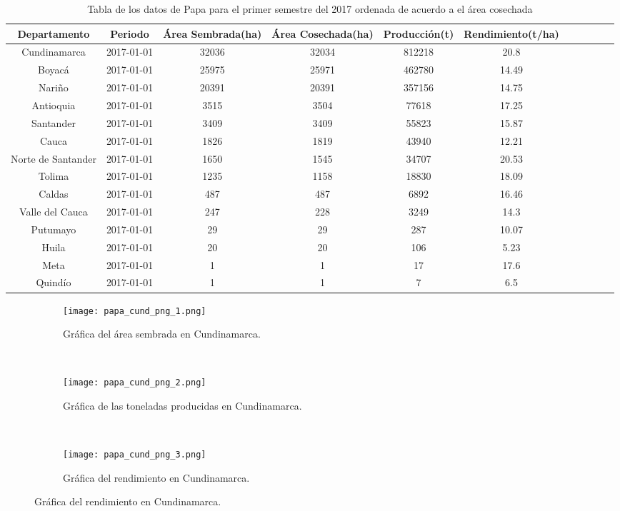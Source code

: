 \documentclass[11pt]{article}
\begin{document}
\newpage
\begin{landscape}



\begin{table}[H] %
\begin{center}
	\begin{tabular}{ccccccccccc}
Departamento&Periodo&Área Sembrada(ha)&Área Cosechada(ha)&Producción(t)&Rendimiento(t/ha)&\\
\hline
Cundinamarca&2017-01-01&32036&32034&812218&20.8&\\
Boyacá&2017-01-01&25975&25971&462780&14.49&\\
Nariño&2017-01-01&20391&20391&357156&14.75&\\
Antioquia&2017-01-01&3515&3504&77618&17.25&\\
Santander&2017-01-01&3409&3409&55823&15.87&\\
Cauca&2017-01-01&1826&1819&43940&12.21&\\
Norte de Santander&2017-01-01&1650&1545&34707&20.53&\\
Tolima&2017-01-01&1235&1158&18830&18.09&\\
Caldas&2017-01-01&487&487&6892&16.46&\\
Valle del Cauca&2017-01-01&247&228&3249&14.3&\\
Putumayo&2017-01-01&29&29&287&10.07&\\
Huila&2017-01-01&20&20&106&5.23&\\
Meta&2017-01-01&1&1&17&17.6&\\
Quindío&2017-01-01&1&1&7&6.5&\\
		\end{tabular}
		
\end{center}
	\caption{Tabla de los datos de Papa para el primer semestre del 2017 ordenada de acuerdo a el área cosechada}
	\label{table:1}
\end{table}

\begin{figure}[h]
	\begin{center}
		\begin{subfigure}[normla]{0.65\textwidth}
		\texttt{[image: papa\_cund\_png\_1.png]}	
		\caption{Gráfica del área sembrada en Cundinamarca.}
		\label{gra:papa_cund_1}	
		\end{subfigure}
		~
		\begin{subfigure}[normla]{0.65\textwidth}
		\texttt{[image: papa\_cund\_png\_2.png]}	
		\caption{Gráfica de las toneladas producidas en Cundinamarca.}
		\label{gra:papa_cund_2}	
		\end{subfigure}
		~
		\begin{subfigure}[normla]{0.65\textwidth}
		\texttt{[image: papa\_cund\_png\_3.png]}	
		\caption{Gráfica del rendimiento en Cundinamarca.}
		\label{gra:papa_cund_3}	
		\end{subfigure}


\end{center}
\end{figure}
\end{landscape}
\end{document}
